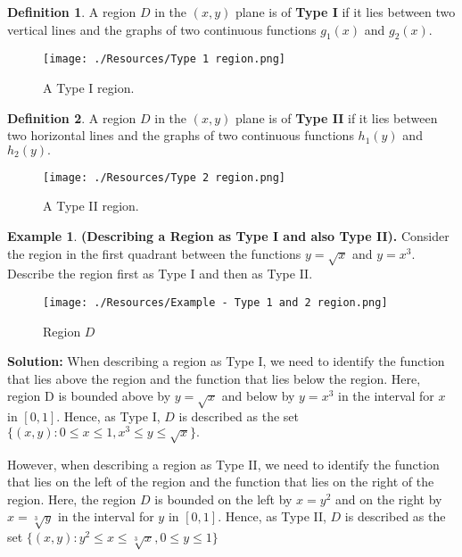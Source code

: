 \documentclass[12pt, a4paper]{article}
\theoremstyle{definition}
\newtheorem{definition}{Definition}[section]
\newtheorem*{example}{Example}
\theoremstyle{plain}
\begin{document}
\begin{definition}
A region $D$ in the $(x, y)$ plane is of \textbf{Type I} if it lies between two vertical lines and the graphs of two continuous functions $g_1 (x)$ and $g_2 (x).$ 
\end{definition}

\begin{figure}[H]
\centering
\texttt{[image: ./Resources/Type 1 region.png]}\caption{A Type I region.}
\end{figure}

\begin{definition}
A region $D$ in the $(x,y)$ plane is of \textbf{Type II} if it lies between two horizontal lines and the graphs of two continuous functions $h_1 (y)$ and $h_2 (y). $
\end{definition}

\begin{figure}[H]
\centering
\texttt{[image: ./Resources/Type 2 region.png]}
\caption{A Type II region.}
\end{figure}

\begin{example}
\textbf{(Describing a Region as Type I and also Type II).}
Consider the region in the first quadrant between the functions $y = \sqrt{x}$ and $y = x^3.$ Describe the region first as Type I and then as Type II. \\

\begin{figure}[H]
\centering
\texttt{[image: ./Resources/Example - Type 1 and 2 region.png]}
\caption{Region $D$}
\label{fig:example Type I & Type II region}
\end{figure} 

\textbf{Solution:}
When describing a region as Type I, we need to identify the function that lies above the region and the function that lies below the region. Here, region D is bounded above by $y = \sqrt{x}$ and below by $y = x^3$ in the interval for $x$ in $[0, 1].$ Hence, as Type I, $D$ is described as the set $\{(x,y) : 0\leq x \leq 1, x^3 \leq y \leq \sqrt{x}\}.$ 
\par However, when describing a region as Type II, we need to identify the function that lies on the left of the region and the function that lies on the right of the region. Here, the region $D$ is bounded on the left by $x = y^2$ and on the right by $x = \sqrt[3]{y}$ in the interval for $y$ in $[0, 1].$ Hence, as Type II, $D$ is described as the set $\{(x,y) : y^2\leq x \leq \sqrt[3]{x},  0\leq y \leq 1\}$
\end{example}
\end{document}
